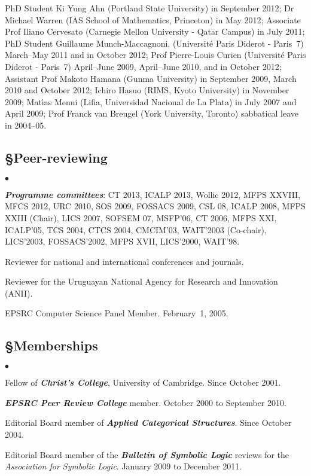 \documentclass[11pt,twocolumn]{article}
\newenvironment{myitemize}
  {\begin{list}{$\bullet$}
  {\setlength{\topsep}{1pt}
   \setlength{\partopsep}{1pt}
   \setlength{\itemsep}{0pt}
   \setlength{\parsep}{0pt}
   \setlength{\leftmargin}{1em}
   \setlength{\labelwidth}{.5em}}}
  {\end{list}}
\begin{document}
\noindent
PhD Student Ki Yung Ahn 
(Portland State University) in September 2012; 
%
Dr Michael Warren (IAS School of Mathematics, Princeton) in May 2012; 
%
Associate Prof Iliano Cervesato (Carnegie Mellon University - Qatar
Campus) in July 2011; 
%
PhD Student Guillaume Munch-Maccagnoni, (Universit\'e Paris Diderot -
Paris~7) March–May 2011 and in October 2012;
%
Prof Pierre-Louis Curien (Universit\'e Paris Diderot - Paris~7)
April--June 2009, April--June 2010, and in October 2012; 
%
Assistant Prof Makoto Hamana (Gunma University) in September 2009, March
2010 and October 2012;
%
Ichiro Hasuo (RIMS, Kyoto University) in November 2009;
%
Mat\'{\i}as Menni (Lifia, Universidad Nacional de La Plata) in July 2007
and April 2009;
%
Prof Franck van Breugel (York University, Toronto) sabbatical leave in
2004--05.

\vspace*{-0mm}
\subsection*{\S\enspace\thinspace Peer-reviewing}

\begin{myitemize}
\item
  \textbf{\em Programme committees}: CT 2013, ICALP 2013, Wollic 2012,
  MFPS XXVIII, MFCS 2012, URC 2010, SOS 2009, FOSSACS 2009, CSL 08, ICALP
  2008, MFPS XXIII (Chair), LICS 2007, SOFSEM 07, MSFP’06, CT 2006, MFPS
  XXI, ICALP’05, TCS 2004, CTCS 2004, CMCIM’03, WAIT’2003 (Co-chair),
  LICS’2003, FOSSACS’2002, MFPS XVII, LICS’2000, WAIT’98.

\item
  Reviewer for national and international conferences and journals.

\item
  Reviewer for the Uruguayan National Agency for Research and Innovation
  (ANII).

\item
  EPSRC Computer Science Panel Member.  February~1, 2005.
\end{myitemize}

\vspace*{-0mm}
\subsection*{\S\enspace\thinspace Memberships}

\begin{myitemize}
\item
  Fellow of \textbf{\em Christ's College}, University of Cambridge.  Since
  October 2001.

\item
  \textbf{\em EPSRC Peer Review College} member. October 2000 to September
  2010.

\item
  Editorial Board member of \textbf{\em Applied Categorical Structures}.
  Since October 2004.

\item
  Editorial Board member of the \textbf{\em Bulletin of Symbolic Logic}
  reviews for the \emph{Association for Symbolic Logic}.  January 2009 to
  December 2011.
\end{myitemize}
\end{document}
